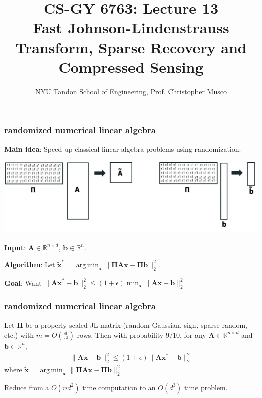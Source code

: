 \documentclass[compress]{beamer}
\title{CS-GY 6763: Lecture 13 \\ Fast Johnson-Lindenstrauss Transform, Sparse Recovery and Compressed Sensing}
\author{NYU Tandon School of Engineering, Prof. Christopher Musco}
\date{}
\newcommand{\bs}[1]{\boldsymbol{#1}}
\newcommand{\bv}[1]{\mathbf{#1}}
\newcommand{\R}{\mathbb{R}}
\DeclareMathOperator*{\argmin}{arg\,min}
\begin{document}
\begin{frame}
	\titlepage 
\end{frame}


\begin{frame}[t]
	\frametitle{randomized numerical linear algebra}
	\textbf{Main idea}: Speed up classical linear algebra problems using randomization.
	\begin{center}
		\includegraphics[width=.8\textwidth]{jlRegression.png}
	\end{center}
\vspace{-1em}
	\textbf{Input}: $\bv{A} \in \R^{n\times d}$, $\bv{b} \in \R^{n}$. 
	
	\textbf{Algorithm}: Let $\tilde{\bv{x}}^* = \argmin_{\bv{x}} \|\bs{\Pi}\bv{A}\bv{x} - \bs{\Pi}\bv{b}\|_2^2$.
	
	\textbf{Goal}: Want $\|\bv{A}\tilde{\bv{x}}^* - \bv{b}\|_2^2 \leq (1+\epsilon) \min_{\bv{x}} \|\bv{A}\bv{x} - \bv{b}\|_2^2$
\end{frame}


\begin{frame}[t]
	\frametitle{randomized numerical linear algebra}
	\begin{theorem}
		Let $\bs{\Pi}$ be a properly scaled JL matrix (random Gaussian, sign, sparse random, etc.) with $m = O\left(\frac{d}{\epsilon^2}\right)$ rows. Then with probability $9/10$, for any $\bv{A}\in \R^{n\times d}$ and $\bv{b}\in \R^n$,
		\begin{align*}
			\|\bv{A}\tilde{\bv{x}} - \bv{b}\|_2^2 \leq (1+\epsilon) \|\bv{A}\bv{x}^* - \bv{b}\|_2^2
		\end{align*}
		where $\tilde{\bv{x}} = \argmin_{\bv{x}} \|\bs{\Pi}\bv{A}\bv{x} - \bs{\Pi}\bv{b}\|_2^2$.
	\end{theorem}
	Reduce from a $O(nd^2)$ time computation to an $O(d^3)$ time problem.
	\end{frame}
\end{document}
